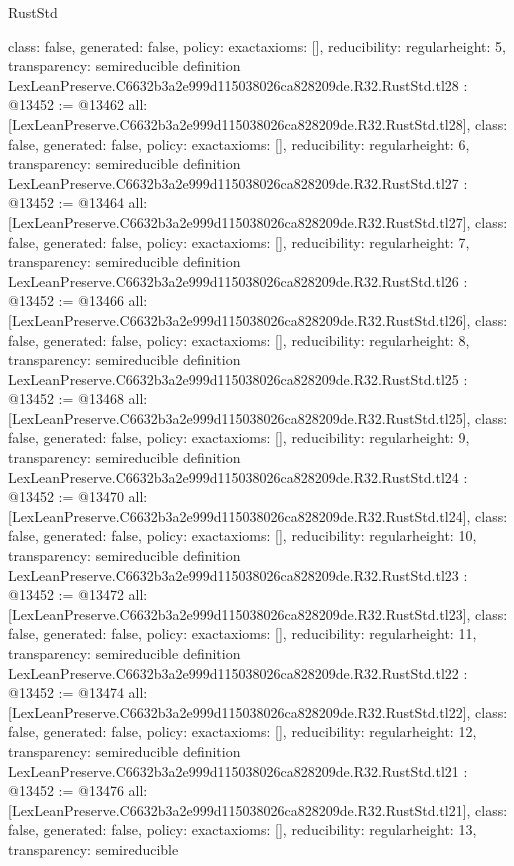 \begin{lexlean}{RustStd}
\begin{coremodule}
{  class: false,
  generated: false,
  policy: exact{axioms: []},
  reducibility: regular{height: 5},
  transparency: semireducible
}
definition LexLeanPreserve.C6632b3a2e999d115038026ca828209de.R32.RustStd.tl28 : @13452 := @13462 {
  all: [LexLeanPreserve.C6632b3a2e999d115038026ca828209de.R32.RustStd.tl28],
  class: false,
  generated: false,
  policy: exact{axioms: []},
  reducibility: regular{height: 6},
  transparency: semireducible
}
definition LexLeanPreserve.C6632b3a2e999d115038026ca828209de.R32.RustStd.tl27 : @13452 := @13464 {
  all: [LexLeanPreserve.C6632b3a2e999d115038026ca828209de.R32.RustStd.tl27],
  class: false,
  generated: false,
  policy: exact{axioms: []},
  reducibility: regular{height: 7},
  transparency: semireducible
}
definition LexLeanPreserve.C6632b3a2e999d115038026ca828209de.R32.RustStd.tl26 : @13452 := @13466 {
  all: [LexLeanPreserve.C6632b3a2e999d115038026ca828209de.R32.RustStd.tl26],
  class: false,
  generated: false,
  policy: exact{axioms: []},
  reducibility: regular{height: 8},
  transparency: semireducible
}
definition LexLeanPreserve.C6632b3a2e999d115038026ca828209de.R32.RustStd.tl25 : @13452 := @13468 {
  all: [LexLeanPreserve.C6632b3a2e999d115038026ca828209de.R32.RustStd.tl25],
  class: false,
  generated: false,
  policy: exact{axioms: []},
  reducibility: regular{height: 9},
  transparency: semireducible
}
definition LexLeanPreserve.C6632b3a2e999d115038026ca828209de.R32.RustStd.tl24 : @13452 := @13470 {
  all: [LexLeanPreserve.C6632b3a2e999d115038026ca828209de.R32.RustStd.tl24],
  class: false,
  generated: false,
  policy: exact{axioms: []},
  reducibility: regular{height: 10},
  transparency: semireducible
}
definition LexLeanPreserve.C6632b3a2e999d115038026ca828209de.R32.RustStd.tl23 : @13452 := @13472 {
  all: [LexLeanPreserve.C6632b3a2e999d115038026ca828209de.R32.RustStd.tl23],
  class: false,
  generated: false,
  policy: exact{axioms: []},
  reducibility: regular{height: 11},
  transparency: semireducible
}
definition LexLeanPreserve.C6632b3a2e999d115038026ca828209de.R32.RustStd.tl22 : @13452 := @13474 {
  all: [LexLeanPreserve.C6632b3a2e999d115038026ca828209de.R32.RustStd.tl22],
  class: false,
  generated: false,
  policy: exact{axioms: []},
  reducibility: regular{height: 12},
  transparency: semireducible
}
definition LexLeanPreserve.C6632b3a2e999d115038026ca828209de.R32.RustStd.tl21 : @13452 := @13476 {
  all: [LexLeanPreserve.C6632b3a2e999d115038026ca828209de.R32.RustStd.tl21],
  class: false,
  generated: false,
  policy: exact{axioms: []},
  reducibility: regular{height: 13},
  transparency: semireducible
}
\end{coremodule}
\end{lexlean}
